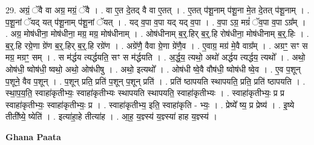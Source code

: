 \documentclass[17pt]{extarticle}
\begin{document}
29. अग्रं॒ ॅवै वा अग्र॒ मग्रं॒ ॅवै । . वा ए॒त दे॒तद् वै वा ए॒तत् । . ए॒तत् प॑शू॒नाम् प॑शू॒ना मे॒त दे॒तत् प॑शू॒नाम् । . प॒शू॒नां ॅयद् यत् प॑शू॒नाम् प॑शू॒नां ॅयत् । . यद् व॒पा व॒पा यद् यद् व॒पा । . व॒पा ऽग्र॒ मग्रं॑ ॅव॒पा व॒पा ऽग्र᳚म् । . अग्र॒ मोष॑धीना॒ मोष॑धीना॒ मग्र॒ मग्र॒ मोष॑धीनाम् । . ओष॑धीनाम् ब॒र्॒.हिर् ब॒र्॒.हि रोष॑धीना॒ मोष॑धीनाम् ब॒र्॒.हिः । . ब॒र्॒.हि रग्रे॒णा ग्रे॑ण ब॒र्॒.हिर् ब॒र्॒.हि रग्रे॑ण । . अग्रे॑णै॒ वैवा ग्रे॒णा ग्रे॑णै॒व । . ए॒वाग्र॒ मग्र॑ मे॒वै वाग्र᳚म् । . अग्रꣳ॒॒ सꣳ स मग्र॒ मग्रꣳ॒॒ सम् । . स म॑र्द्धय त्यर्द्धयति॒ सꣳ स म॑र्द्धयति । . अ॒र्द्ध॒य॒ त्यथो॒ अथो॑ अर्द्धय त्यर्द्धय॒ त्यथो᳚ । . अथो॒ ओष॑धी॒ ष्वोष॑धी॒ ष्वथो॒ अथो॒ ओष॑धीषु । . अथो॒ इत्यथो᳚ । . ओष॑धी ष्वे॒वै वौष॑धी॒ ष्वोष॑धी ष्वे॒व । . ए॒व प॒शून् प॒शूने॒ वैव प॒शून् । . प॒शून् प्रति॒ प्रति॑ प॒शून् प॒शून् प्रति॑ । . प्रति॑ ष्ठापयति स्थापयति॒ प्रति॒ प्रति॑ ष्ठापयति । . स्था॒प॒य॒ति॒ स्वाहा॑कृतीभ्यः॒ स्वाहा॑कृतीभ्यः स्थापयति स्थापयति॒ स्वाहा॑कृतीभ्यः । . स्वाहा॑कृतीभ्यः॒ प्र प्र स्वाहा॑कृतीभ्यः॒ स्वाहा॑कृतीभ्यः॒ प्र । . स्वाहा॑कृतीभ्य॒ इति॒ स्वाहा॑कृति - भ्यः॒ । . प्रेष्ये᳚ ष्य॒ प्र प्रेष्य॑ । . इ॒ष्ये तीती᳚ष्ये॒ ष्येति॑ । . इत्या॑हा॒हे तीत्या॑ह । . आ॒ह॒ य॒ज्ञ्स्य॑ य॒ज्ञ्स्या॑ हाह य॒ज्ञ्स्य॑ । \newline

\textbf{Ghana Paata } \newline
\end{document}
